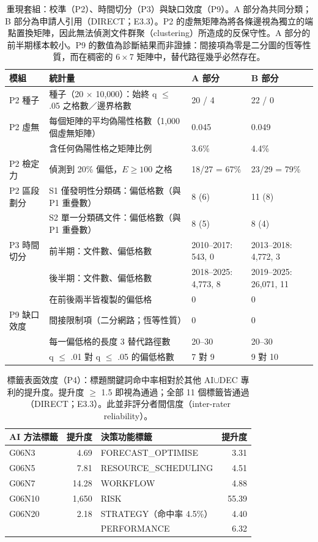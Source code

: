 \begin{table}[tbp]
\centering
\caption{重現套組：校準（P2）、時間切分（P3）與缺口效度（P9）。A 部分為共同分類；B 部分為申請人引用（DIRECT；E3.3）。P2 的虛無矩陣為將各條邊視為獨立的端點置換矩陣，因此無法偵測文件群聚（clustering）所造成的反保守性。A 部分的前半期樣本較小。P9 的數值為診斷結果而非證據：間接項為零是二分圖的恆等性質，而在稠密的 $6\times7$ 矩陣中，替代路徑幾乎必然存在。}
\label{zh:tab:app_suite}
\footnotesize
\begin{tabular}{lp{6.0cm}ll}
\toprule
模組 & 統計量 & A 部分 & B 部分 \\
\midrule
P2 種子 & 種子（20 $\times$ 10,000）：始終 q $\leq$ .05 之格數／邊界格數 & 20 / 4 & 22 / 0 \\
P2 虛無 & 每個矩陣的平均偽陽性格數（1,000 個虛無矩陣） & 0.045 & 0.049 \\
 & 含任何偽陽性格之矩陣比例 & 3.6\% & 4.4\% \\
P2 檢定力 & 偵測到 20\% 偏低，$E\geq100$ 之格 & 18/27 = 67\% & 23/29 = 79\% \\
P2 區段劃分 & S1 僅發明性分類碼：偏低格數（與 P1 重疊數） & 8 (6) & 11 (8) \\
 & S2 單一分類碼文件：偏低格數（與 P1 重疊數） & 8 (5) & 8 (4) \\
\midrule
P3 時間切分 & 前半期：文件數、偏低格數 & 2010--2017: 543, 0 & 2013--2018: 4,772, 3 \\
 & 後半期：文件數、偏低格數 & 2018--2025: 4,773, 8 & 2019--2025: 26,071, 11 \\
 & 在前後兩半皆複製的偏低格 & 0 & 0 \\
\midrule
P9 缺口效度 & 間接限制項（二分網路；恆等性質） & 0 & 0 \\
 & 每一偏低格的長度 3 替代路徑數 & 20--30 & 20--30 \\
 & q $\leq$ .01 對 q $\leq$ .05 的偏低格數 & 7 對 9 & 9 對 10 \\
\bottomrule
\end{tabular}
\end{table}

\begin{table}[tbp]
\centering
\caption{標籤表面效度（P4）：標題關鍵詞命中率相對於其他 AI$\cup$DEC 專利的提升度。提升度 $\geq$ 1.5 即視為通過；全部 11 個標籤皆通過（DIRECT；E3.3）。此並非評分者間信度（inter-rater reliability）。}
\label{zh:tab:app_lift}
\footnotesize
\begin{tabular}{lr@{\hspace{1.2cm}}lr}
\toprule
AI 方法標籤 & 提升度 & 決策功能標籤 & 提升度 \\
\midrule
G06N3 & 4.69 & FORECAST\_OPTIMISE & 3.31 \\
G06N5 & 7.81 & RESOURCE\_SCHEDULING & 4.51 \\
G06N7 & 14.28 & WORKFLOW & 4.88 \\
G06N10 & 1,650 & RISK & 55.39 \\
G06N20 & 2.18 & STRATEGY（命中率 4.5\%） & 4.40 \\
 & & PERFORMANCE & 6.32 \\
\bottomrule
\end{tabular}
\end{table}

